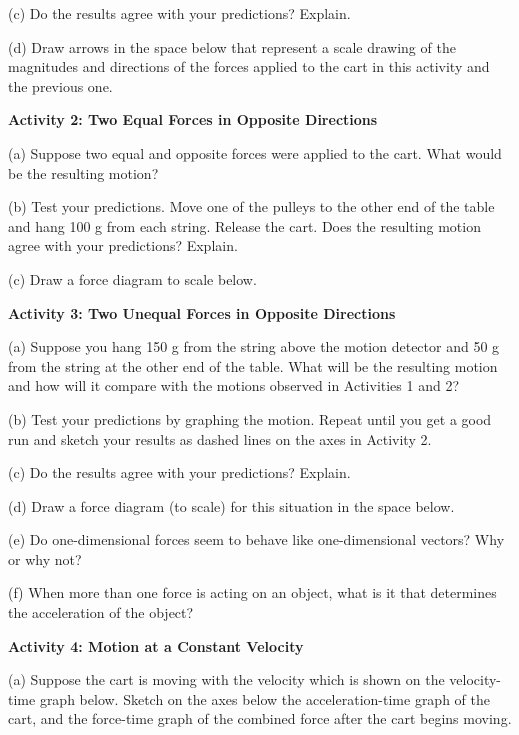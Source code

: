 (c) Do the results agree with your predictions? Explain.
\answerspace{20mm}

(d) Draw arrows in the space below that represent a scale drawing of the magnitudes
and directions of the forces applied to the cart in this activity and the previous
one.
\answerspace{20mm}

\textbf{Activity 2: Two Equal Forces in Opposite Directions}

(a) Suppose two equal and opposite forces were applied to the cart. What would
be the resulting motion?
\answerspace{10mm}

\pagebreak[2]
(b) Test your predictions. Move one of the pulleys to the other end of the table
and hang 100 g from each string. Release the cart. Does the resulting motion
agree with your predictions? Explain.
\answerspace{20mm}

(c) Draw a force diagram to scale below.
\answerspace{20mm}

\textbf{Activity 3: Two Unequal Forces in Opposite Directions}

(a) Suppose you hang 150 g from the string above the motion detector and 50
g from the string at the other end of the table. What will be the resulting
motion and how will it compare with the motions observed in Activities 1 and
2?
\answerspace{20mm}

(b) Test your predictions by graphing the motion. Repeat until you get a good
run and sketch your results as dashed lines on the axes in Activity 2.

(c) Do the results agree with your predictions? Explain.
\answerspace{20mm}

(d) Draw a force diagram (to scale) for this situation in the space below.
\vspace{10mm}

(e) Do one-dimensional forces seem to behave like one-dimensional vectors? Why
or why not?
\answerspace{20mm}

(f) When more than one force is acting on an object, what is it that determines
the acceleration of the object?
\answerspace{20mm}

\pagebreak[2]
\textbf{Activity 4: Motion at a Constant Velocity}

(a) Suppose the cart is moving with the velocity which is shown on the velocity-time
graph below. Sketch on the axes below the acceleration-time graph of the cart,
and the force-time graph of the combined force after the cart begins moving.

